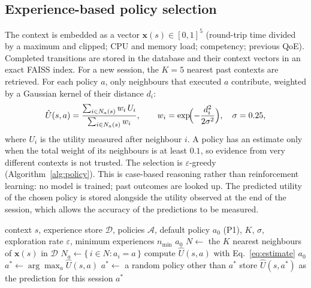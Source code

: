 \subsection{Experience-based policy selection}

The context is embedded as a vector $\mathbf{x}(s) \in [0,1]^5$ (round-trip time divided by a maximum and clipped;
CPU and memory load; competency; previous QoE). Completed transitions are stored in the database and their context
vectors in an exact FAISS index. For a new session, the $K = 5$ nearest past contexts are retrieved. For each policy
$a$, only neighbours that executed $a$ contribute, weighted by a Gaussian kernel of their distance $d_i$:
\begin{equation}
  \hat{U}(s, a) = \frac{\sum_{i \in N_a(s)} w_i\, U_i}{\sum_{i \in N_a(s)} w_i},
  \qquad w_i = \exp\!\Bigl(-\frac{d_i^2}{2\sigma^2}\Bigr), \quad \sigma = 0.25,
  \label{eq:estimate}
\end{equation}
where $U_i$ is the utility measured after neighbour $i$. A policy has an estimate only when the total weight of its
neighbours is at least $0.1$, so evidence from very different contexts is not trusted. The selection is
$\varepsilon$-greedy (Algorithm~\ref{alg:policy}). This is case-based reasoning rather than reinforcement learning: no
model is trained; past outcomes are looked up. The predicted utility of the chosen policy is stored alongside the
utility observed at the end of the session, which allows the accuracy of the predictions to be measured.

\begin{algorithm}[htbp]
\caption{Experience-based policy selection}
\label{alg:policy}
\begin{algorithmic}[1]
\Require context $s$, experience store $\mathcal{D}$, policies $\mathcal{A}$, default policy $a_0$ (P1),
         $K$, $\sigma$, exploration rate $\varepsilon$, minimum experiences $n_{\min}$
 \State \Return $a_0$ 
\EndIf
\State $N \gets$ the $K$ nearest neighbours of $\mathbf{x}(s)$ in $\mathcal{D}$
  \State $N_a \gets \{\, i \in N : a_i = a \,\}$
   \State compute $\hat{U}(s,a)$ with Eq.~\eqref{eq:estimate}
  \EndIf
\EndFor
{} \State \Return $a_0$
\EndIf
\State $a^{\ast} \gets \arg\max_a \hat{U}(s,a)$ 
 \State $a^{\ast} \gets$ a random policy other than $a^{\ast}$ 
\EndIf
\State store $\hat{U}(s, a^{\ast})$ as the prediction for this session
\State \Return $a^{\ast}$
\end{algorithmic}
\end{algorithm}

